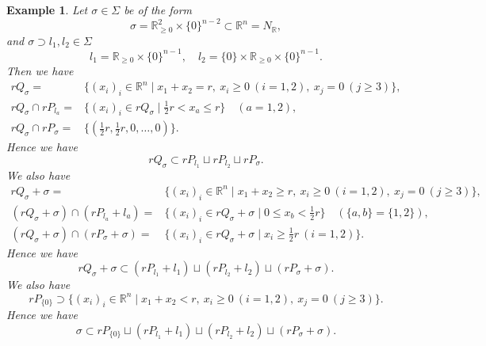 \documentclass[12pt,a4]{amsart}
\newtheorem{exam}[thm]{Example}
\def\R{\mathbb{R}}
\numberwithin{equation}{section}
\numberwithin{figure}{section}
\begin{document}
  \begin{exam}\label{exam for unimodular triangulation:label}
   Let $\sigma \in \Sigma$ be of the form
     $$\sigma = \R_{\geq 0}^2 \times \{ 0 \}^{n-2}  \subset \R^n = N_\R, $$
    and $ \sigma \supset l_1,l_2 \in \Sigma$ 
     $$l_1 = \R_{\geq 0} \times \{ 0 \}^{n-1}    , \quad 
     l_2 = \{ 0 \} \times \R_{\geq 0} \times \{ 0 \}^{n-1}  . $$
    Then we have 
    \begin{align*}
     rQ_{\sigma } 
    = & \{  (x_i)_{ i  } \in \R^n 
     \mid 
                  x_1+x_2 = r  , \
                   x_i \geq 0 \ (i=1,2), \ 
                    x_j =0 \ (j \geq 3)
                    \} ,  \\
     rQ_{\sigma } \cap rP_{l_a} 
    =  &\{  (x_i)_{ i  } \in rQ_{\sigma } 
     \mid 
                    \frac{1}{2} r <  x_a \leq r 
                    \}  
                    \quad (a=1,2) ,  \\
     rQ_{\sigma } \cap rP_{\sigma} 
    =&  \{ (\frac{1}{2} r, \frac{1}{2} r, 0, \dots, 0 )
                    \}    .
      \end{align*}
      Hence we have $$
     rQ_{\sigma } 
    \subset  
       rP_{l_1} \sqcup
       rP_{l_2} \sqcup
       rP_{\sigma}
        .$$
    We also have 
    \begin{align*}
     rQ_{\sigma } + \sigma 
    = & \{  (x_i)_{ i  } \in \R^n 
     \mid 
                  x_1+x_2 \geq  r  , \
                   x_i \geq 0 \ (i=1,2), \ 
                    x_j =0 \ (j \geq 3)
                    \} ,  \\
     (rQ_{\sigma } + \sigma) \cap ( rP_{l_{a}} +l_{a})
    =  &\{  (x_i)_{ i  } \in rQ_{\sigma } + \sigma 
     \mid 
                    0 \leq   x_{b}  < \frac{1}{2} r 
                    \}  \quad  (\{a,b \}=\{1,2 \}) ,  \\
     (rQ_{\sigma } + \sigma) \cap (  rP_{\sigma} + \sigma)
    =&  \{  (x_i)_{ i  } \in rQ_{\sigma } + \sigma 
     \mid 
                  x_i \geq \frac{1}{2} r \ (i=1,2) 
                    \}    .
      \end{align*}
      Hence we have $$
     rQ_{\sigma } + \sigma
    \subset  
       (rP_{l_1} + l_1 ) \sqcup
       (rP_{l_2} + l_2  )\sqcup
       (rP_{\sigma} + \sigma )
        .$$
    We also have 
    $$ rP_{ \{ 0 \} } \supset 
        \{  (x_i)_{ i  } \in \R^n 
     \mid 
                  x_1+x_2 < r  , \
                   x_i \geq 0 \ (i=1,2), \ 
                    x_j =0 \ (j \geq 3)
                    \} .$$
      Hence we have $$
      \sigma
    \subset  
       rP_{ \{ 0 \} } \sqcup 
      ( rP_{l_1} + l_1  )\sqcup
      ( rP_{l_2} + l_2  )\sqcup
      ( rP_{\sigma} + \sigma )
        .$$
  \end{exam}
\end{document}

